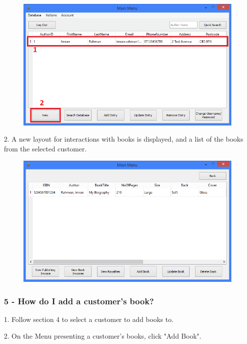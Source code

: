 \begin{figure}[H]
    \includegraphics[width=\textwidth]{./Manual/Tutorial/Q4/View.png}
\end{figure}

2. A new layout for interactions with books is displayed, and a list of the books from the selected customer. 

\begin{figure}[H]
    \includegraphics[width=\textwidth]{./Manual/Tutorial/Q4/CustomerBooks.png}
\end{figure}

\subsubsection{5 -  How do I add a customer's book?}

1. Follow section 4 to select a customer to add books to.

2. On the Menu presenting a customer's books, click "Add Book".

